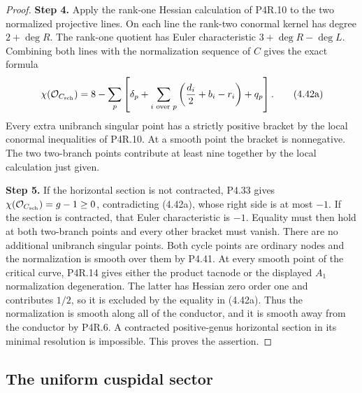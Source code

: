 \begin{proof}
\noindent\textbf{Step 4.} Apply the rank-one Hessian calculation
of P4R.10 to the two normalized projective lines. On each
line the rank-two conormal kernel has degree $2+\deg R$.
The rank-one quotient has Euler characteristic
$3+\deg R-\deg L$. Combining both lines with the
normalization sequence of $C$ gives the exact formula
\[
 \chi(\mathcal O_{C_{\rm sch}})
   =8-\sum_p\left[
       \delta_p+\sum_{i\text{ over }p}
          \left(\frac{d_i}{2}+b_i-r_i\right)+q_p
                 \right].                            \tag{4.42a}
\]
Every extra unibranch singular point has a strictly positive
bracket by the local conormal inequalities of P4R.10.
At a smooth point the bracket is nonnegative. The two
two-branch points contribute at least nine together by the
local calculation just given.

\noindent\textbf{Step 5.} If the horizontal section is not contracted, P4.33 gives
$\chi(\mathcal O_{C_{\rm sch}})=g-1\ge0$, contradicting
(4.42a), whose right side is at most $-1$.
If the section is contracted, that Euler characteristic is
$-1$. Equality must then hold at both two-branch points and every
other bracket must vanish. There are no additional
unibranch singular points. Both cycle points are ordinary
nodes and the normalization is smooth over them by P4.41.
At every smooth point of the
critical curve, P4R.14 gives either the product tacnode
or the displayed $A_1$ normalization degeneration. The
latter has Hessian zero order one and contributes $1/2$,
so it is excluded by the equality in (4.42a). Thus the
normalization is smooth along all of the conductor, and
it is smooth away from the conductor by P4R.6. A contracted
positive-genus horizontal section in its minimal resolution
is impossible. This proves the assertion.
\end{proof}


\subsection{The uniform cuspidal sector}

